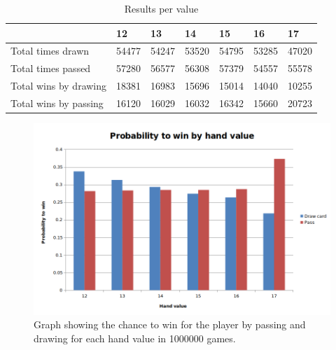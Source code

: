 \begin{table}[H]
    \caption{Results per value}
\begin{tabular}{|l|l|l|l|l|l|l|}
\hline
 & 12 & 13 & 14 & 15 & 16 & 17 \\ \hline
Total times drawn  & 54477 & 54247 & 53520 & 54795 & 53285 & 47020 \\ \hline
Total times passed  & 57280 & 56577 & 56308 & 57379 & 54557 & 55578 \\ \hline
Total wins by drawing  & 18381 & 16983 & 15696 & 15014 & 14040 & 10255 \\ \hline
Total wins by passing  & 16120 & 16029 & 16032 & 16342 & 15660 & 20723 \\ \hline
\end{tabular}
\end{table}
\begin{figure}[H]
  \centering
  \includegraphics[width=\linewidth]{fig/GraphWinChanceCardValue.png}
  \caption{Graph showing the chance to win for the player by passing and drawing for each hand value in 1000000 games.}
\end{figure}
